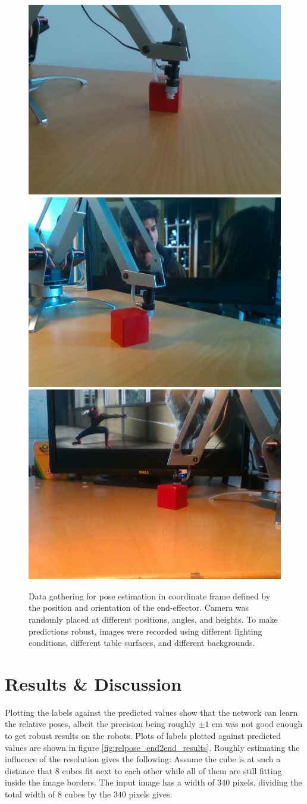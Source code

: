 \begin{figure}[ht!]
    \centering
    \includegraphics[width=0.3 \textwidth]{res/spiderman1.jpg}
    \includegraphics[width=0.3 \textwidth]{res/spiderman2.jpg}
    \includegraphics[width=0.3 \textwidth]{res/spiderman3.jpg}

    \caption{Data gathering for pose estimation in coordinate frame defined by
    the position and orientation of the end-effector. Camera was randomly
    placed at different positions, angles, and heights. To make predictions
    robust, images were recorded using different lighting conditions, different
    table surfaces, and different backgrounds.}

    \label{fig:relpose-training-data}
    
\end{figure}

\section{Results \& Discussion}

Plotting the labels against the predicted values show that the network can
learn the relative poses, albeit the precision being roughly $\pm 1$ cm was not
good enough to get robust results on the robots. Plots of labels plotted
against predicted values are shown in figure \ref{fig:relpose_end2end_results}.
Roughly estimating the influence of the resolution gives the following: Assume
the cube is at such a distance that $8$ cubes fit next to each other while all
of them are still fitting inside the image borders. The input image has a width
of $340$ pixels, dividing the total width of $8$ cubes by the $340$ pixels
gives:

